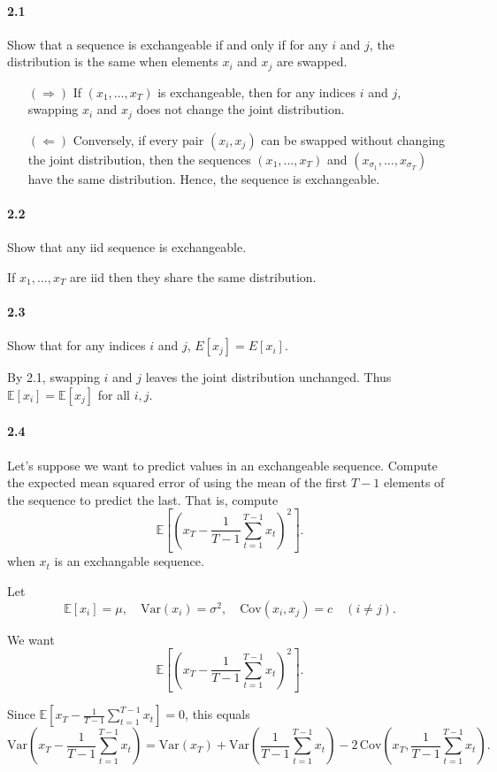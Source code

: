 \documentclass[a4paper]{article}
\begin{document}
\paragraph{2.1}
Show that a sequence is exchangeable if and only if for any $i$ and $j$, the distribution is the same when elements $x_i$ and $x_j$ are swapped.
\begin{itemize}
    \item[$(\Rightarrow)$] If $(x_1,\dots,x_T)$ is exchangeable, then for any indices $i$ and $j$, swapping $x_i$ and $x_j$ does not change the joint distribution.
    \item[$(\Leftarrow)$] Conversely, if every pair $(x_i, x_j)$ can be swapped without changing the joint distribution, then the sequences $(x_1,\dots,x_T)$ and $(x_{\sigma_1},\dots,x_{\sigma_T})$ have the same distribution. Hence, the sequence is exchangeable.
\end{itemize}

\paragraph{2.2}
Show that any iid sequence is exchangeable.

If $x_1,\dots,x_T$ are iid then they share the same distribution.
\paragraph{2.3}
Show that for any indices $i$ and $j$, $E[x_j ] = E[x_i ]$.

By 2.1, swapping $i$ and $j$ leaves the joint distribution unchanged.
Thus $\mathbb{E}[x_i]=\mathbb{E}[x_j]$ for all $i,j$.
\paragraph{2.4}
Let’s suppose we want to predict values in an exchangeable sequence.
Compute the expected mean squared error of using the mean of the first $T - 1$ elements of the sequence to predict the last.
That is, compute
$$\mathbb{E}\left[\left(x_T - \frac{1}{T-1}\sum_{t=1}^{T-1}x_t\right)^2\right].$$
when $x_t$ is an exchangable sequence.

Let 
\[
\mathbb{E}[x_i] = \mu,\quad \mathrm{Var}(x_i) = \sigma^2,\quad \mathrm{Cov}(x_i, x_j) = c \quad (i \neq j).
\]

We want
\[
\mathbb{E}\!\left[\left(x_T - \frac{1}{T-1}\sum_{t=1}^{T-1} x_t\right)^2\right].
\]

Since $\mathbb{E}[x_T - \frac{1}{T-1}\sum_{t=1}^{T-1} x_t] = 0$, this equals
\[
\mathrm{Var}(x_T - \frac{1}{T-1}\sum_{t=1}^{T-1} x_t)
= \mathrm{Var}(x_T) + \mathrm{Var}(\frac{1}{T-1}\sum_{t=1}^{T-1} x_t) - 2\,\mathrm{Cov}(x_T, \frac{1}{T-1}\sum_{t=1}^{T-1} x_t).
\]
\end{document}

